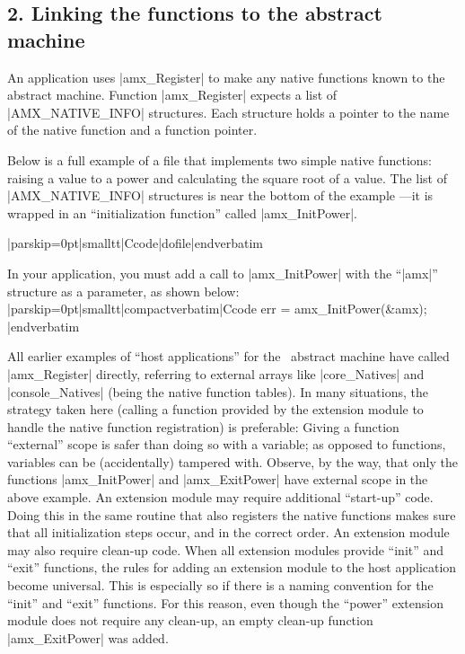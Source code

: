 \goodbreak
\subsection{2. Linking the functions to the abstract machine}
An application uses |amx_Register| to make any native functions known to the
abstract machine. Function |amx_Register| expects a list of |AMX_NATIVE_INFO|
structures. Each structure holds a pointer to the name of the native function
and a function pointer.

Below is a full example of a file that implements two simple native functions:
raising a value to a power and calculating the square root of a value. The list
of |AMX_NATIVE_INFO| structures is near the bottom of the example ---it is wrapped
in an ``initialization function'' called |amx_InitPower|.

\goodbreak
\bigskip{}
\verbatim|parskip=0pt|smalltt|Ccode|dofile|endverbatim\endlistingx

In your application, you must add a call to |amx_InitPower| with the ``|amx|''
structure as a parameter, as shown below:
\listingx\verbatim|parskip=0pt|smalltt|compactverbatim|Ccode
err = amx_InitPower(&amx);
|endverbatim\endlistingx

All earlier examples of ``host applications'' for the \Small\ abstract machine
have called |amx_Register| directly, referring to external arrays like
|core_Natives| and |console_Natives| (being the native function tables). In
many situations, the strategy taken here (calling a function provided by the
extension module to handle the native function registration) is preferable:
\beginlist{1em}\compactlist
\list{\lbullet}
  Giving a function ``external'' scope is safer than doing so with a variable;
  as opposed to functions, variables can be (accidentally) tampered with.
  Observe, by the way, that only the functions |amx_InitPower| and |amx_ExitPower|
  have external scope in the above example.
\list{\lbullet}
  An extension module may require additional ``start-up'' code. Doing this in
  the same routine that also registers the native functions makes sure that
  all initialization steps occur, and in the correct order.
\list{\lbullet}
  An extension module may also require clean-up code. When all extension modules
  provide ``init'' and ``exit'' functions, the rules for adding an extension module
  to the host application become universal. This is especially so if there is
  a naming convention for the ``init'' and ``exit'' functions. For this reason,
  even though the ``power'' extension module does not require any clean-up, an
  empty clean-up function |amx_ExitPower| was added.
\endlist


